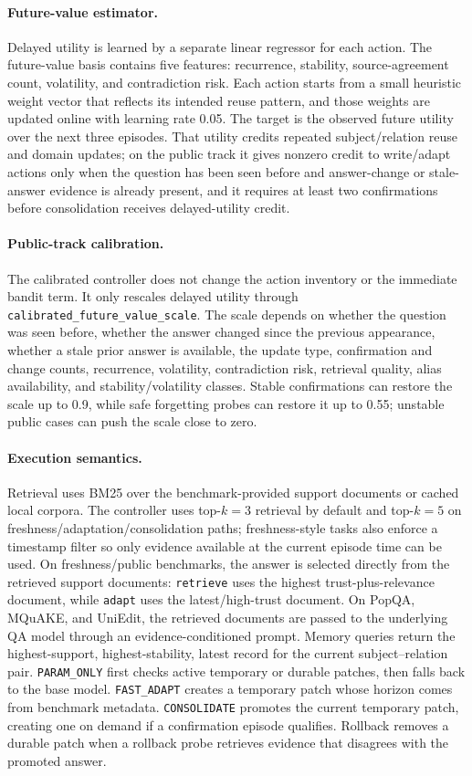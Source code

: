 \paragraph{Future-value estimator.}
Delayed utility is learned by a separate linear regressor for each action. The future-value basis contains five features: recurrence, stability, source-agreement count, volatility, and contradiction risk. Each action starts from a small heuristic weight vector that reflects its intended reuse pattern, and those weights are updated online with learning rate 0.05. The target is the observed future utility over the next three episodes. That utility credits repeated subject/relation reuse and domain updates; on the public track it gives nonzero credit to write/adapt actions only when the question has been seen before and answer-change or stale-answer evidence is already present, and it requires at least two confirmations before consolidation receives delayed-utility credit.

\paragraph{Public-track calibration.}
The calibrated controller does not change the action inventory or the immediate bandit term. It only rescales delayed utility through \texttt{calibrated\_future\_value\_scale}. The scale depends on whether the question was seen before, whether the answer changed since the previous appearance, whether a stale prior answer is available, the update type, confirmation and change counts, recurrence, volatility, contradiction risk, retrieval quality, alias availability, and stability/volatility classes. Stable confirmations can restore the scale up to 0.9, while safe forgetting probes can restore it up to 0.55; unstable public cases can push the scale close to zero.

\paragraph{Execution semantics.}
Retrieval uses BM25 over the benchmark-provided support documents or cached local corpora. The controller uses top-$k=3$ retrieval by default and top-$k=5$ on freshness/adaptation/consolidation paths; freshness-style tasks also enforce a timestamp filter so only evidence available at the current episode time can be used. On freshness/public benchmarks, the answer is selected directly from the retrieved support documents: \texttt{retrieve} uses the highest trust-plus-relevance document, while \texttt{adapt} uses the latest/high-trust document. On PopQA, MQuAKE, and UniEdit, the retrieved documents are passed to the underlying QA model through an evidence-conditioned prompt. Memory queries return the highest-support, highest-stability, latest record for the current subject--relation pair. \texttt{PARAM\_ONLY} first checks active temporary or durable patches, then falls back to the base model. \texttt{FAST\_ADAPT} creates a temporary patch whose horizon comes from benchmark metadata. \texttt{CONSOLIDATE} promotes the current temporary patch, creating one on demand if a confirmation episode qualifies. Rollback removes a durable patch when a rollback probe retrieves evidence that disagrees with the promoted answer.

